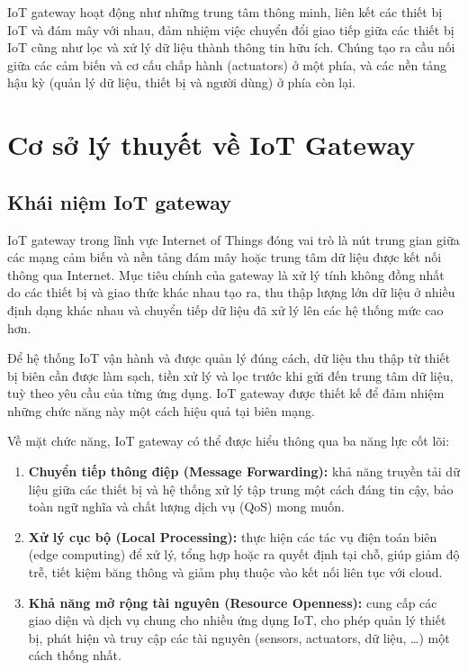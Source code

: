             IoT gateway hoạt động như những trung tâm thông minh, liên kết các thiết bị IoT và đám mây với nhau, đảm nhiệm việc chuyển đổi giao tiếp giữa các thiết bị IoT cũng như lọc và xử lý dữ liệu thành thông tin hữu ích. Chúng tạo ra cầu nối giữa các cảm biến và cơ cấu chấp hành (actuators) ở một phía, và các nền tảng hậu kỳ (quản lý dữ liệu, thiết bị và người dùng) ở phía còn lại.
    \section{Cơ sở lý thuyết về IoT Gateway}
        \subsection{Khái niệm IoT gateway}
            IoT gateway trong lĩnh vực Internet of Things đóng vai trò là nút trung gian giữa các mạng cảm biến và nền tảng đám mây hoặc trung tâm dữ liệu được kết nối thông qua Internet. Mục tiêu chính của gateway là xử lý tính không đồng nhất do các thiết bị và giao thức khác nhau tạo ra, thu thập lượng lớn dữ liệu ở nhiều định dạng khác nhau và chuyển tiếp dữ liệu đã xử lý lên các hệ thống mức cao hơn.

            Để hệ thống IoT vận hành và được quản lý đúng cách, dữ liệu thu thập từ thiết bị biên cần được làm sạch, tiền xử lý và lọc trước khi gửi đến trung tâm dữ liệu, tuỳ theo yêu cầu của từng ứng dụng. IoT gateway được thiết kế để đảm nhiệm những chức năng này một cách hiệu quả tại biên mạng.

            Về mặt chức năng, IoT gateway có thể được hiểu thông qua ba năng lực cốt lõi:
            \begin{enumerate}
                \item \textbf{Chuyển tiếp thông điệp (Message Forwarding):} khả năng truyền tải dữ liệu giữa các thiết bị và hệ thống xử lý tập trung một cách đáng tin cậy, bảo toàn ngữ nghĩa và chất lượng dịch vụ (QoS) mong muốn.
                \item \textbf{Xử lý cục bộ (Local Processing):} thực hiện các tác vụ điện toán biên (edge computing) để xử lý, tổng hợp hoặc ra quyết định tại chỗ, giúp giảm độ trễ, tiết kiệm băng thông và giảm phụ thuộc vào kết nối liên tục với cloud.
                \item \textbf{Khả năng mở rộng tài nguyên (Resource Openness):} cung cấp các giao diện và dịch vụ chung cho nhiều ứng dụng IoT, cho phép quản lý thiết bị, phát hiện và truy cập các tài nguyên (sensors, actuators, dữ liệu, \dots) một cách thống nhất.
            \end{enumerate}

